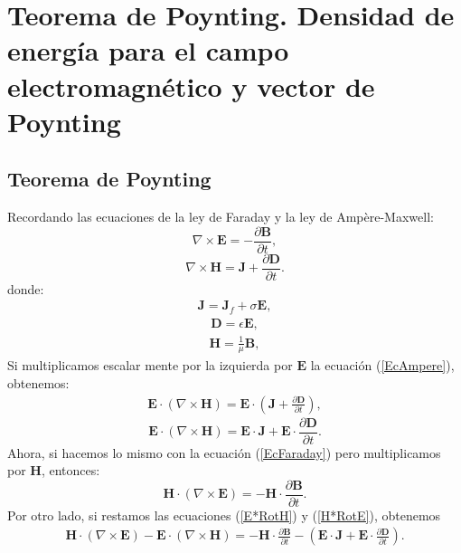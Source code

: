 \documentclass[11pt,fleqn]{book} %
\begin{document}
\section{Teorema de Poynting. Densidad de energ\'ia para el campo electromagn\'etico y vector de Poynting}
\subsection{Teorema de Poynting}
Recordando las ecuaciones de la ley de Faraday y la ley de Ampère-Maxwell:
\begin{equation}
\nabla\times\textbf{E}=-\frac{\partial \textbf{B}}{\partial t}, \label{EcFaraday}
\end{equation}
\begin{equation}
\nabla\times\textbf{H}=\textbf{J}+\frac{\partial \textbf{D}}{\partial t}. \label{EcAmpere}
\end{equation}
donde:
\begin{eqnarray*}
\textbf{J}=\textbf{J}_{f}+\sigma\textbf{E},
\end{eqnarray*}
\begin{eqnarray*}
\textbf{D}=\epsilon\textbf{E},
\end{eqnarray*}
\begin{eqnarray*}
\textbf{H}=\frac{1}{\mu}\textbf{B},
\end{eqnarray*}
Si multiplicamos escalar mente por la izquierda por $\textbf{E}$ la ecuaci\'on (\ref{EcAmpere}), obtenemos:
\begin{eqnarray*}
\textbf{E}\cdot(\nabla\times\textbf{H})=\textbf{E}\cdot\left(\textbf{J}+\frac{\partial \textbf{D}}{\partial t}\right),
\end{eqnarray*}
\begin{equation}
\textbf{E}\cdot(\nabla\times\textbf{H})=\textbf{E}\cdot\textbf{J}+\textbf{E}\cdot\frac{\partial \textbf{D}}{\partial t}.  \label{E*RotH}
\end{equation}
 Ahora, si hacemos lo mismo con la ecuaci\'on (\ref{EcFaraday}) pero multiplicamos por $\textbf{H}$, entonces:
\begin{equation}
\textbf{H}\cdot(\nabla\times\textbf{E})=-\textbf{H}\cdot\frac{\partial \textbf{B}}{\partial t}. \label{H*RotE}
\end{equation}
 Por otro lado, si restamos las ecuaciones (\ref{E*RotH}) y (\ref{H*RotE}), obtenemos
\begin{eqnarray*}
\textbf{H}\cdot(\nabla\times\textbf{E})-\textbf{E}\cdot(\nabla\times\textbf{H})=-\textbf{H}\cdot\frac{\partial \textbf{B}}{\partial t}-\left( \textbf{E}\cdot\textbf{J}+\textbf{E}\cdot\frac{\partial \textbf{D}}{\partial t} \right).
\end{eqnarray*}
\end{document}
